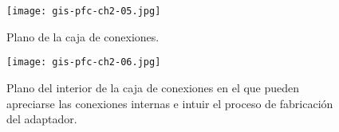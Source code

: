 \clearpage

\begin{figure}[p]
	\begin{center}
		\texttt{[image: gis-pfc-ch2-05.jpg]}
	\end{center}
	\caption[Caja de conexiones, accesorio terminado]{Plano de la caja
	de conexiones.}
	\label{fig:conbox}
\end{figure}

\begin{figure}[p]
	\begin{center}
		\texttt{[image: gis-pfc-ch2-06.jpg]}
	\end{center}
	\caption[Caja de conexiones, vista del interior]{Plano del interior
	de la caja de conexiones en el que pueden apreciarse las conexiones
	internas e intuir el proceso de fabricación del adaptador.}
	\label{fig:conbox-inside}
\end{figure}
